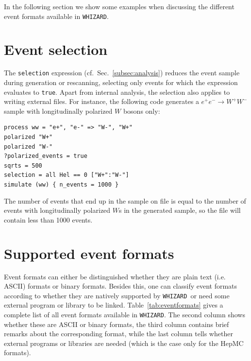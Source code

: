 \documentclass[12pt]{book}
\newcommand{\ttt}[1]{\texttt{#1}}
\newcommand{\whizard}{\ttt{WHIZARD}}
\begin{document}
In the following section we show some examples when discussing the
different event formats available in \whizard.


\section{Event selection}

The \ttt{selection} expression (cf.\ Sec.~\ref{subsec:analysis})
reduces the event sample during generation or rescanning, selecting
only events for which the expression evaluates to \ttt{true}.  Apart
from internal analysis, the selection also applies to writing external
files.  For instance, the following code generates a $e^+e^-\to
W^+W^-$ sample with longitudinally polarized $W$ bosons only:
\begin{footnotesize}
\begin{verbatim}
process ww = "e+", "e-" => "W-", "W+"
polarized "W+"
polarized "W-"
?polarized_events = true
sqrts = 500
selection = all Hel == 0 ["W+":"W-"]
simulate (ww) { n_events = 1000 }
\end{verbatim}
\end{footnotesize}
The number of events that end up in the sample on file is equal to the
number of events with longitudinally polarized $W$s in the generated
sample, so the file will contain less than 1000 events.



\section{Supported event formats}
\label{sec:eventformats}

Event formats can either be distinguished whether they are plain
text (i.e. ASCII) formats or binary formats. Besides this, one can
classify event formats according to whether they are natively
supported by \whizard\ or need some external program or library to be
linked. Table~\ref{tab:eventformats} gives a complete list of all
event formats available in \whizard. The second column shows whether
these are ASCII or binary formats, the third column contains brief
remarks about the corresponding format, while the last column tells
whether external programs or libraries are needed (which is the case
only for the HepMC formats).
\end{document}
